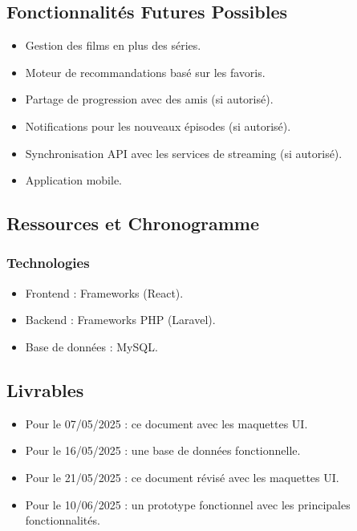 \subsection{Fonctionnalités Futures Possibles}
\begin{itemize}
    \item Gestion des films en plus des séries.
    \item Moteur de recommandations basé sur les favoris.
    \item Partage de progression avec des amis (si autorisé).
    \item Notifications pour les nouveaux épisodes (si autorisé).
    \item Synchronisation API avec les services de streaming (si autorisé).
    \item Application mobile.
\end{itemize}

\subsection{Ressources et Chronogramme}

\subsubsection{Technologies}
\begin{itemize}
    \item Frontend : Frameworks (React).
    \item Backend : Frameworks PHP (Laravel).
    \item Base de données : MySQL.
\end{itemize}

\subsection{Livrables}
\begin{itemize}
    \item Pour le 07/05/2025 : ce document avec les maquettes UI.
    \item Pour le 16/05/2025 : une base de données fonctionnelle.
    \item Pour le 21/05/2025 : ce document révisé avec les maquettes UI.
    \item Pour le 10/06/2025 : un prototype fonctionnel avec les principales fonctionnalités.
\end{itemize}
